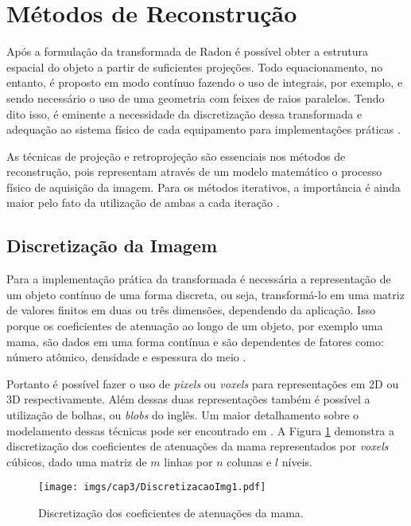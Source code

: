 \section{Métodos de Reconstrução}

Após a formulação da transformada de Radon é possível obter a estrutura espacial do objeto a partir de suficientes projeções. Todo equacionamento, no entanto, é proposto em modo contínuo fazendo o uso de integrais, por exemplo, e sendo necessário o uso de uma geometria com feixes de raios paralelos. Tendo dito isso, é eminente a necessidade da discretização dessa transformada e adequação ao sistema físico de cada equipamento para implementações práticas \cite{levakhina2014three}. 

As técnicas de projeção e retroprojeção são essenciais nos métodos de reconstrução, pois representam através de um modelo matemático o processo físico de aquisição da imagem. Para os métodos iterativos, a importância é ainda maior pelo fato da utilização de ambas a cada iteração \cite{levakhina2014three}.   

\subsection{Discretização da Imagem}\label{DiscretizaçãodaImagem}

Para a implementação prática da transformada é necessária a representação de um objeto contínuo de uma forma discreta, ou seja, transformá-lo em uma matriz de valores finitos em duas ou três dimensões, dependendo da aplicação. Isso porque os coeficientes de atenuação ao longo de um objeto, por exemplo uma mama, são dados em uma forma contínua e são dependentes de fatores como: número atômico, densidade e espessura do meio \cite{yang2012numerical}.  

Portanto é possível fazer o uso de \textit{pixels} ou \textit{voxels} para representações em \acs{2D} ou \acs{3D} respectivamente. Além dessas duas representações também é possível a utilização de bolhas, ou \textit{blobs} do inglês. Um maior detalhamento sobre o modelamento dessas técnicas pode ser encontrado em  . A Figura \ref{fig:imgCap3DiscretizacaoImagem1} demonstra a discretização dos coeficientes de atenuações da mama representados por \textit{voxels} cúbicos, dado uma matriz de $m$ linhas por $n$ colunas e $l$ níveis.   

\begin{figure}[H]
	\caption{Discretização dos coeficientes de atenuações da mama.}
	\begin{center}
		\texttt{[image: imgs/cap3/DiscretizacaoImg1.pdf]}
	\end{center}
	\label{fig:imgCap3DiscretizacaoImagem1}
\end{figure}

